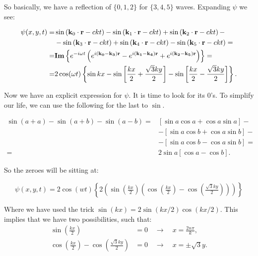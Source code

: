 So basically, we have a reflection of $\{0,1,2\}$ for $\{3,4,5\}$ waves. Expanding $\psi$ we see:

\begin{equation}
	\begin{split}
			\psi(x, y, t)=& \sin \left(\mathbf{k}_{0} \cdot \mathbf{r}-c k t\right) - \sin \left(\mathbf{k}_{1} \cdot \mathbf{r}-c k t\right) + \sin \left(\mathbf{k}_{2} \cdot \mathbf{r}-c k t\right)-\\
			&-\sin \left(\mathbf{k}_{3} \cdot \mathbf{r}-c k t\right) + \sin \left(\mathbf{k}_{4} \cdot \mathbf{r}-c k t\right) -\sin \left(\mathbf{k}_{5} \cdot \mathbf{r}-c k t\right) = \\
			=& \text{\textbf{Im}} \left\{e^{-i\omega t}\left(e^{i (\mathbf{k_{0}} - \mathbf{k_{3}})\mathbf{r}} - e^{i (\mathbf{k_{1}} - \mathbf{k_{4}})\mathbf{r}} +e^{i (\mathbf{k_{2}} - \mathbf{k_{5}})\mathbf{r}}\right)\right\}=\\
			=& 2 \cos (\omega t)\left\{\sin k x-\sin \left[\frac{k x}{2}+\frac{\sqrt{3} k y}{2}\right]-\sin \left[\frac{k x}{2}-\frac{\sqrt{3} k y}{2}\right]\right\}.
	\end{split}
\end{equation}

Now we have an explicit expression for $\psi$. It is time to look for its 0's. To simplify our life, we can use the following for the last to $\sin$.

\begin{equation}
	\begin{split}
		\sin (a+a)-\sin (a+b)-\sin (a-b)=&[\sin a \cos a+\cos a \sin a]-\\
		&-[\sin a \cos b+\cos a \sin b]-\\
		&-[\sin a \cos b-\cos a \sin b]=\\
		=&2 \sin a[\cos a-\cos b].
	\end{split}
\end{equation}

So the zeroes will be sitting at:

\begin{equation}
	\psi(x,y,t) = 2 \cos(wt) \left\{2\left(\sin (\tfrac{kx}{2})\left(\cos(\tfrac{kx}{2})-\cos(\tfrac{\sqrt{3} ky}{2})\right)\right)\right\}
\end{equation}

Where we have used the trick $\sin(kx) = 2\sin(kx/2)\cos(kx/2)$. This implies that we have two possibilities, such that:
\begin{equation}
	\begin{split}
		\sin(\tfrac{kx}{2}) &= 0 \quad \rightarrow \quad x = \tfrac{2 n \pi}{k},\\
		\cos(\tfrac{kx}{2}) - \cos(\tfrac{\sqrt{3}ky}{2}) &=0 \quad \rightarrow \quad x = \pm \sqrt{3} y. 
	\end{split}
\end{equation}

